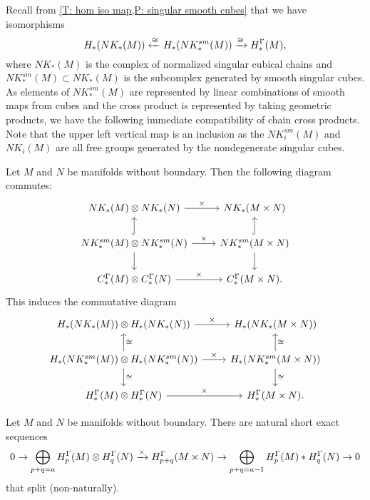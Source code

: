 Recall from \cref{T: hom iso map,P: singular smooth cubes} that we have isomorphisms $$H_*(NK_*(M)) \xleftarrow{\cong} H_*(NK^{sm}_*(M)) \xrightarrow{\cong} H_*^\Gamma(M),$$ where $NK_*(M)$ is the complex of normalized singular cubical chains and $NK^{sm}_*(M) \subset NK_*(M)$ is the subcomplex generated by smooth singular cubes.
As elements of $NK^{sm}_*(M)$ are represented by linear combinations of smooth maps from cubes and the cross product is represented by taking geometric products, we have the following immediate compatibility of chain cross products. Note that the upper left vertical map is an inclusion as the $NK^{sm}_i(M)$ and $NK_i(M)$ are all free groups generated by the nondegenerate singular cubes.

\begin{lemma}\label{L: chain cross compare}
	Let $M$ and $N$ be manifolds without boundary.
	Then the following diagram commutes:
	\[
	\begin{tikzcd}
		NK_*(M) \otimes NK_*(N) \arrow{r}{\times}  & NK_*(M \times N)  \\
		NK^{sm}_*(M) \otimes NK^{sm}_*(N) \arrow{r}{\times} \arrow[d] \arrow[hookrightarrow]{u}& NK^{sm}_*(M \times N) \arrow[d]\arrow[hookrightarrow]{u} \\
		C_*^\Gamma(M) \otimes C_*^\Gamma(N) \arrow{r}{\times} & C_*^\Gamma(M \times N).
	\end{tikzcd}
	\]
	This induces the commutative diagram
	\[
	\begin{tikzcd}
		H_*(NK_*(M)) \otimes H_*(NK_*(N)) \arrow{r}{\times}  &
		H_*(NK_*(M \times N)) \\
		H_*(NK^{sm}_*(M)) \otimes H_*(NK^{sm}_*(N)) \arrow{r}{\times} \arrow[d, "\cong"] \arrow[u, "\cong"']&
		H_*(NK^{sm}_*(M \times N)) \arrow[d, "\cong"] \arrow[u, "\cong"'] \\
		H_*^\Gamma(M) \otimes H_*^\Gamma(N) \arrow{r}{\times} & H_*^\Gamma(M \times N).
	\end{tikzcd}
	\]
\end{lemma}

\begin{theorem}\label{T: homology kunneth}
	Let $M$ and $N$ be manifolds without boundary.
	There are natural short exact sequences
	\[
	0 \to \bigoplus_{p+q = a} H_p^\Gamma(M) \otimes H_q^\Gamma(N) \xrightarrow{\times} H_{p+q}^\Gamma(M \times N) \to \bigoplus_{p+q = a-1} H_p^\Gamma(M)* H_q^\Gamma(N) \to 0
	\]
	that split (non-naturally).
\end{theorem}

